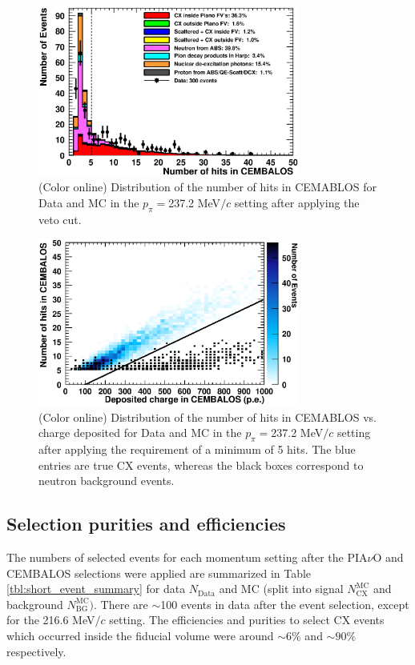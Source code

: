 \begin{figure}[ht]
 \includegraphics[width=86mm]{figures/duettag_nhits_20000_forpaper_v2.eps}
 \caption{(Color online) Distribution of the number of hits in CEMABLOS for Data and MC in the $p_\pi=$237.2 MeV$/c$ setting after applying the veto cut.}
 \label{fig:nhits}
\end{figure}

\begin{figure}[ht]
 \includegraphics[width=86mm]{figures/draw2Dcut_draw.eps}
 \caption{(Color online) Distribution of the number of hits in CEMABLOS vs. charge deposited for Data and MC in the $p_\pi=$237.2 MeV$/c$ setting after applying the requirement of a minimum of 5 hits. The blue entries are true CX events, whereas the black boxes correspond to neutron background events.}
 \label{fig:nhitsvsCharge}
\end{figure}


\subsection{Selection purities and efficiencies}
The numbers of selected events for each momentum setting after the PIA$\nu$O and CEMBALOS selections were applied are summarized in Table \ref{tbl:short_event_summary} for data $N_{\mathrm{Data}}$ and MC (split into signal $N_{\mathrm{CX}}^{\mathrm{MC}}$ and background $N_{\mathrm{BG}}^{\mathrm{MC}})$. There are $\sim$100 events in data after the event selection, except for the 216.6 MeV$/c$ setting. The efficiencies and purities to select CX events which occurred inside the fiducial volume were around $\sim6\%$ and $\sim90\%$ respectively.

